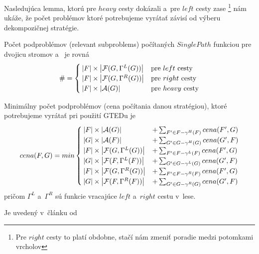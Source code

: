 Nasledujúca lemma, ktorú pre $heavy$ cesty dokázali \citet{DMRW}
a~pre $left$ cesty zase \citet{ZHANGSHASHA}
\footnote{Pre $right$ cesty to platí obdobne, stačí nám zmeniť poradie medzi potomkami vrcholov}
nám ukáže, že počet problémov ktoré potrebujeme vyrátať závisí od výberu dekompozičnej stratégie.

\begin{lemma}
  Počet podproblémov (relevant subproblems) počítaných $SinglePath$ funkciou pre dvojicu
  stromov  a~ je rovná
  \begin{align*}
    \# = 
    \begin{cases}
      \left|{F}\right| \times \left|{\mathcal{F}(G, \Gamma^{L}(G))}\right| & \text{pre $left$ cesty}
      \\
      \left|{F}\right| \times \left|{\mathcal{F}(G, \Gamma^{R}(G))}\right| & \text{pre $right$ cesty}
      \\
      \left|{F}\right| \times \left|{\mathcal{A}(G)}\right| & \text{pre $heavy$ cesty}
    \end{cases}
  \end{align*}
\end{lemma}

\begin{lemma}
  Minimálny počet podproblémov (cena počítania danou stratégiou),
  ktoré potrebujeme vyrátať pri použití GTEDu je
  \begin{align*}
    cena(F, G) = min
    \begin{cases}
      \left|{F}\right| \times \left|{\mathcal{A}(G)}\right| &+ \sum_{{F}' \in F - \gamma^{H}(F)}cena({F}', G)
      \\
      \left|{G}\right| \times \left|{\mathcal{A}(F)}\right| &+ \sum_{{G}' \in G - \gamma^{H}(G)}cena({G}', F)
      \\
      \left|{F}\right| \times \left|{\mathcal{F}(G, \Gamma^{L}(G))}\right| &+ \sum_{{F}' \in F - \gamma^{L}(F)}cena({F}', G)
      \\
      \left|{G}\right| \times \left|{\mathcal{F}(F, \Gamma^{L}(F))}\right| &+ \sum_{{G}' \in G - \gamma^{L}(G)}cena({G}', F)
      \\
      \left|{F}\right| \times \left|{\mathcal{F}(G, \Gamma^{R}(G))}\right| &+ \sum_{{F}' \in F - \gamma^{R}(F)}cena({F}', G)
      \\
      \left|{G}\right| \times \left|{\mathcal{F}(F, \Gamma^{R}(F))}\right| &+ \sum_{{G}' \in G - \gamma^{R}(G)}cena({G}', F)
    \end{cases}
  \end{align*}
  pričom $\Gamma^{L}$ a~$\Gamma^{R}$ sú funkcie vracajúce $left$ a~$right$ cestu v~lese.
\end{lemma}

\begin{dukaz}
  Je uvedený v~článku od \citet{RTED}
\end{dukaz}

